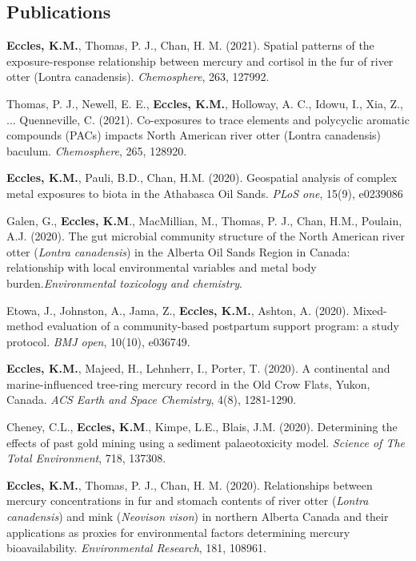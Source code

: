\documentclass[margin,line]{res}
\begin{document}
\begin{resume}
\section{\sc Publications}

\textbf{Eccles, K.M.}, Thomas, P. J., Chan, H. M. (2021). Spatial patterns of the exposure-response relationship between mercury and cortisol in the fur of river otter (Lontra canadensis). \textit{Chemosphere}, 263, 127992.

Thomas, P. J., Newell, E. E., \textbf{Eccles, K.M.}, Holloway, A. C., Idowu, I., Xia, Z., ... Quenneville, C. (2021). Co-exposures to trace elements and polycyclic aromatic compounds (PACs) impacts North American river otter (Lontra canadensis) baculum. \textit{Chemosphere}, 265, 128920.

\textbf{Eccles, K.M.}, Pauli, B.D., Chan, H.M. (2020). Geospatial analysis of complex metal exposures to biota in the Athabasca Oil Sands. \textit{PLoS one}, 15(9), e0239086

Galen, G., \textbf{Eccles, K.M}., MacMillian, M., Thomas, P. J., Chan, H.M., Poulain, A.J. (2020). The gut microbial community structure of the North American river otter (\textit{Lontra canadensis}) in the Alberta Oil Sands Region in Canada: relationship with local environmental variables and metal body burden.\textit{Environmental toxicology and chemistry}.

Etowa, J., Johnston, A., Jama, Z., \textbf{Eccles, K.M.}, Ashton, A. (2020). Mixed-method evaluation of a community-based postpartum support program: a study protocol. \textit{BMJ open}, 10(10), e036749.

\textbf{Eccles, K.M.}, Majeed, H., Lehnherr, I., Porter, T. (2020). A continental and marine-influenced tree-ring mercury record in the Old Crow Flats, Yukon, Canada. \textit{ACS Earth and Space Chemistry}, 4(8), 1281-1290.

Cheney, C.L., \textbf{Eccles, K.M}., Kimpe, L.E., Blais, J.M. (2020). Determining the effects of past gold mining using a sediment palaeotoxicity model. \textit{Science of The Total Environment}, 718, 137308.

\textbf{Eccles, K.M.}, Thomas, P. J., Chan, H. M. (2020). Relationships between mercury concentrations in fur and stomach contents of river otter (\textit{Lontra canadensis}) and mink (\textit{Neovison vison}) in northern Alberta Canada and their applications as proxies for environmental factors determining mercury bioavailability. \textit{Environmental Research}, 181, 108961.


\end{resume}
\end{document}
